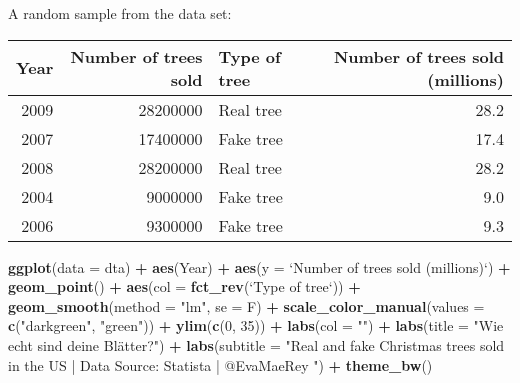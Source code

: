 \documentclass[]{book}
\newenvironment{Shaded}{\begin{snugshade}}{\end{snugshade}}
\newcommand{\KeywordTok}[1]{\textcolor[rgb]{0.13,0.29,0.53}{\textbf{#1}}}
\newcommand{\DataTypeTok}[1]{\textcolor[rgb]{0.13,0.29,0.53}{#1}}
\newcommand{\DecValTok}[1]{\textcolor[rgb]{0.00,0.00,0.81}{#1}}
\newcommand{\StringTok}[1]{\textcolor[rgb]{0.31,0.60,0.02}{#1}}
\newcommand{\OperatorTok}[1]{\textcolor[rgb]{0.81,0.36,0.00}{\textbf{#1}}}
\newcommand{\NormalTok}[1]{#1}
\theoremstyle{definition}
\theoremstyle{definition}
\theoremstyle{definition}
\theoremstyle{remark}
\begin{document}
A random sample from the data set:

\begin{tabular}{r|r|l|r}
\hline
Year & Number of trees sold & Type of tree & Number of trees sold (millions)\\
\hline
2009 & 28200000 & Real tree & 28.2\\
\hline
2007 & 17400000 & Fake tree & 17.4\\
\hline
2008 & 28200000 & Real tree & 28.2\\
\hline
2004 & 9000000 & Fake tree & 9.0\\
\hline
2006 & 9300000 & Fake tree & 9.3\\
\hline
\end{tabular}

\begin{Shaded}
\begin{Highlighting}[]
\KeywordTok{ggplot}\NormalTok{(}\DataTypeTok{data =}\NormalTok{ dta) }\OperatorTok{+}
\StringTok{  }\KeywordTok{aes}\NormalTok{(Year) }\OperatorTok{+}
\StringTok{  }\KeywordTok{aes}\NormalTok{(}\DataTypeTok{y =} \StringTok{`}\DataTypeTok{Number of trees sold (millions)}\StringTok{`}\NormalTok{) }\OperatorTok{+}
\StringTok{  }\KeywordTok{geom_point}\NormalTok{() }\OperatorTok{+}
\StringTok{  }\KeywordTok{aes}\NormalTok{(}\DataTypeTok{col =} \KeywordTok{fct_rev}\NormalTok{(}\StringTok{`}\DataTypeTok{Type of tree}\StringTok{`}\NormalTok{)) }\OperatorTok{+}
\StringTok{  }\KeywordTok{geom_smooth}\NormalTok{(}\DataTypeTok{method =} \StringTok{"lm"}\NormalTok{, }\DataTypeTok{se =}\NormalTok{ F) }\OperatorTok{+}
\StringTok{  }\KeywordTok{scale_color_manual}\NormalTok{(}\DataTypeTok{values =} \KeywordTok{c}\NormalTok{(}\StringTok{"darkgreen"}\NormalTok{, }\StringTok{"green"}\NormalTok{)) }\OperatorTok{+}
\StringTok{  }\KeywordTok{ylim}\NormalTok{(}\KeywordTok{c}\NormalTok{(}\DecValTok{0}\NormalTok{, }\DecValTok{35}\NormalTok{)) }\OperatorTok{+}
\StringTok{  }\KeywordTok{labs}\NormalTok{(}\DataTypeTok{col =} \StringTok{""}\NormalTok{) }\OperatorTok{+}
\StringTok{  }\KeywordTok{labs}\NormalTok{(}\DataTypeTok{title =} \StringTok{"Wie echt sind deine Blätter?"}\NormalTok{) }\OperatorTok{+}
\StringTok{  }\KeywordTok{labs}\NormalTok{(}\DataTypeTok{subtitle =} \StringTok{"Real and fake Christmas trees sold in the US | Data Source: Statista | @EvaMaeRey "}\NormalTok{) }\OperatorTok{+}
\StringTok{  }\KeywordTok{theme_bw}\NormalTok{() }
\end{Highlighting}
\end{Shaded}
\end{document}
